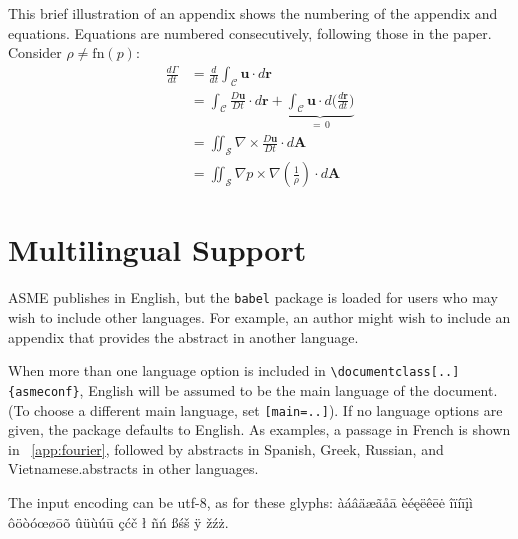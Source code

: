 \documentclass[balance,upint,subscriptcorrection,varvw,mathalfa=cal=boondoxo,spanish,french,vietnamese,russian,greek,pdf-a,fontspec,colorlinks]{asmeconf}
\begin{document}
This brief illustration of an appendix shows the numbering of the appendix and equations. Equations are numbered
consecutively, following those in the paper. Consider $\rho \neq \textrm{fn}(p)$:
\begin{align}
\frac{d\Gamma}{dt} &{}= \frac{d}{dt} \int_{\mathcal{C}} \mathbf{u} \cdot d\mathbf{r}\\
				   &{}= \int_{\mathcal{C}} \frac{D\mathbf{u}}{Dt} \cdot d\mathbf{r} + \underbrace{\int_{\mathcal{C}} \mathbf{u}\cdot d\biggl( \frac{d\mathbf{r}}{dt}\Biggr)}_{=\, 0} \\[-2pt]
                   &{}= \iint_{\mathcal{S}} \nabla \times \frac{D\mathbf{u}}{Dt}  \cdot d\mathbf{A}\\
                   &{}= \iint_{\mathcal{S}}  \nabla p \times \nabla \left( \frac{1}{\rho}\right) \cdot d\mathbf{A}
\end{align}

\section{Multilingual Support}\label{appendix:b}

ASME publishes in English, but the \texttt{babel} package is loaded for 
users who may wish to include other languages. For example, an author might wish to include an appendix that provides the 
abstract in another language.

When more than one language option is included in \verb|\documentclass[..]{asmeconf}|, English will be 
assumed to be the main language of the document. (To choose a different main language, set \texttt{[main=..]}).
If no language options are given, the package defaults to English.  As examples, a passage in French is 
shown in \appendixname~\ref{app:fourier}, followed by 
\ifpdftex abstracts in Spanish, Greek, Russian, and Vietnamese.\else abstracts in other languages.\fi

The input encoding can be utf-8, as for these glyphs:
%
àáâäæãåā  èéęëêēė  îïíīįì ôöòóœøōõ ûüùúū çćč ł ñń ßśš ÿ žźż.
\end{document}
